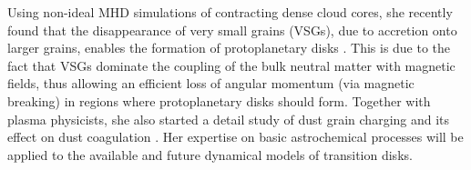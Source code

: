 \documentclass[10pt,fleqn,twoside,a4paper]{article}
\begin{document}
Using non-ideal MHD simulations of contracting dense cloud cores, 
she recently found that the disappearance of very small grains (VSGs), 
due to accretion onto larger grains, enables the formation of 
protoplanetary disks \citep{2016MNRAS.460.2050Z}. This is due to the fact 
that VSGs dominate the coupling of the bulk neutral matter with magnetic 
fields, thus allowing an efficient loss of angular momentum (via magnetic 
breaking) in regions where protoplanetary disks should form. Together 
with plasma physicists, she also started a detail study of dust grain 
charging and its effect on dust coagulation \citep{2015ApJ...812..135I}.
Her expertise on basic astrochemical
processes will be applied to the available and future dynamical models
of transition disks. \\
\end{document}
